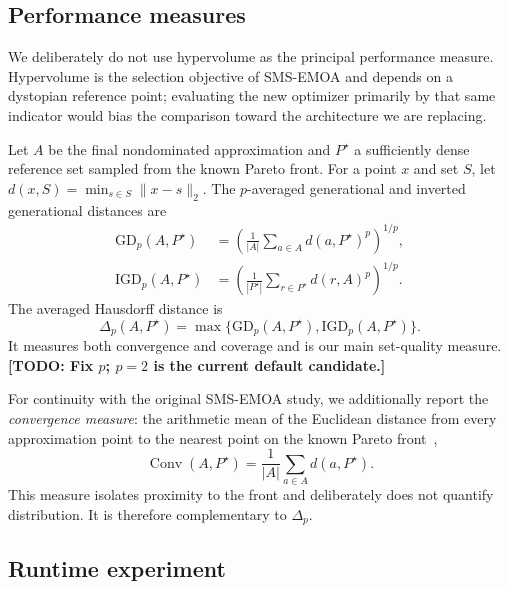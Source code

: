 \documentclass[runningheads]{llncs}
\newcommand{\DeltaP}{\Delta_p}
\newcommand{\todo}[1]{\textcolor{red!70!black}{\textbf{[TODO: #1]}}}
\begin{document}
\subsection{Performance measures}

We deliberately do not use hypervolume as the principal performance measure. Hypervolume is the selection objective of SMS-EMOA and depends on a dystopian reference point; evaluating the new optimizer primarily by that same indicator would bias the comparison toward the architecture we are replacing.

Let $A$ be the final nondominated approximation and $P^\star$ a sufficiently dense reference set sampled from the known Pareto front. For a point $x$ and set $S$, let $d(x,S)=\min_{s\in S}\|x-s\|_2$. The $p$-averaged generational and inverted generational distances are
\begin{align}
    \mathrm{GD}_p(A,P^\star)
    &=\left(\frac{1}{|A|}\sum_{a\in A}d(a,P^\star)^p\right)^{1/p},\\
    \mathrm{IGD}_p(A,P^\star)
    &=\left(\frac{1}{|P^\star|}\sum_{r\in P^\star}d(r,A)^p\right)^{1/p}.
\end{align}
The averaged Hausdorff distance is~\cite{SchuetzeEtAl2012}
\begin{equation}
    \DeltaP(A,P^\star)
    =\max\{\mathrm{GD}_p(A,P^\star),\mathrm{IGD}_p(A,P^\star)\}.
\end{equation}
It measures both convergence and coverage and is our main set-quality measure. \todo{Fix $p$; $p=2$ is the current default candidate.}

For continuity with the original SMS-EMOA study, we additionally report the \emph{convergence measure}: the arithmetic mean of the Euclidean distance from every approximation point to the nearest point on the known Pareto front~\cite{BeumeNaujoksEmmerich2007},
\begin{equation}
    \operatorname{Conv}(A,P^\star)
    =\frac{1}{|A|}\sum_{a\in A}d(a,P^\star).
\end{equation}
This measure isolates proximity to the front and deliberately does not quantify distribution. It is therefore complementary to $\Delta_p$.

\subsection{Runtime experiment}
\end{document}
